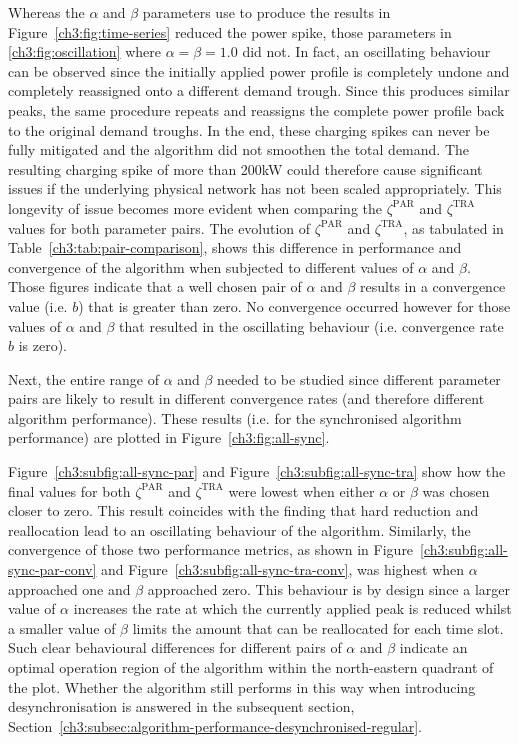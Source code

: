 

Whereas the $\alpha$ and $\beta$ parameters use to produce the results in Figure~\ref{ch3:fig:time-series} reduced the power spike, those parameters in \ref{ch3:fig:oscillation} where $\alpha = \beta = 1.0$ did not.
In fact, an oscillating behaviour can be observed since the initially applied power profile is completely undone and completely reassigned onto a different demand trough.
Since this produces similar peaks, the same procedure repeats and reassigns the complete power profile back to the original demand troughs.
In the end, these charging spikes can never be fully mitigated and the algorithm did not smoothen the total demand.
The resulting charging spike of more than 200kW could therefore cause significant issues if the underlying physical network has not been scaled appropriately.
This longevity of issue becomes more evident when comparing the $\zeta^\text{PAR}$ and $\zeta^\text{TRA}$ values for both parameter pairs.
The evolution of $\zeta^\text{PAR}$ and $\zeta^\text{TRA}$, as tabulated in Table~\ref{ch3:tab:pair-comparison}, shows this difference in performance and convergence of the algorithm when subjected to different values of $\alpha$ and $\beta$.
Those figures indicate that a well chosen pair of $\alpha$ and $\beta$ results in a convergence value (i.e. $b$) that is greater than zero.
No convergence occurred however for those values of $\alpha$ and $\beta$ that resulted in the oscillating behaviour (i.e. convergence rate $b$ is zero).

Next, the entire range of $\alpha$ and $\beta$ needed to be studied since different parameter pairs are likely to result in different convergence rates (and therefore different algorithm performance).
These results (i.e. for the synchronised algorithm performance) are plotted in Figure~\ref{ch3:fig:all-sync}.



Figure~\ref{ch3:subfig:all-sync-par} and Figure~\ref{ch3:subfig:all-sync-tra} show how the final values for both $\zeta^\text{PAR}$ and $\zeta^\text{TRA}$ were lowest when either $\alpha$ or $\beta$ was chosen closer to zero.
This result coincides with the finding that hard reduction and reallocation lead to an oscillating behaviour of the algorithm.
Similarly, the convergence of those two performance metrics, as shown in Figure~\ref{ch3:subfig:all-sync-par-conv} and Figure~\ref{ch3:subfig:all-sync-tra-conv}, was highest when $\alpha$ approached one and $\beta$ approached zero.
This behaviour is by design since a larger value of $\alpha$ increases the rate at which the currently applied peak is reduced whilst a smaller value of $\beta$ limits the amount that can be reallocated for each time slot.
Such clear behavioural differences for different pairs of $\alpha$ and $\beta$ indicate an optimal operation region of the algorithm within the north-eastern quadrant of the plot.
Whether the algorithm still performs in this way when introducing desynchronisation is answered in the subsequent section, Section~\ref{ch3:subsec:algorithm-performance-desynchronised-regular}.


